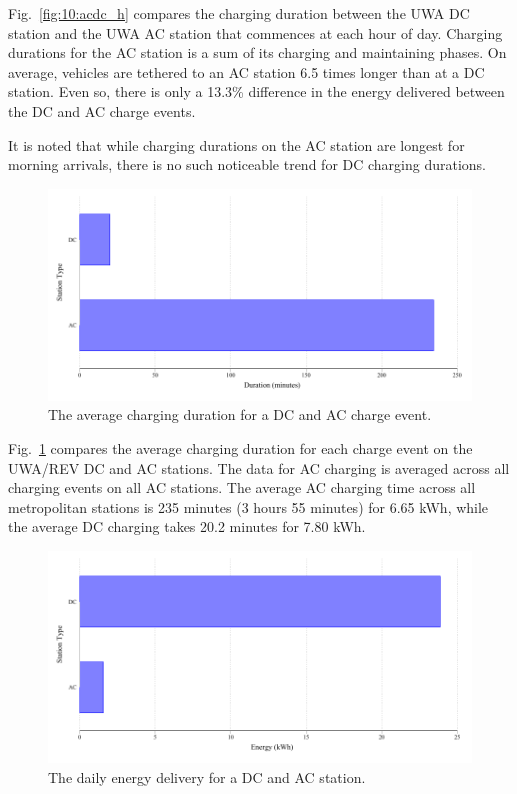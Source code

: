 Fig.~\ref{fig:10:acdc_h} compares the charging duration between the UWA DC station and the UWA AC station that commences at each hour of day. Charging durations for the AC station is a sum of its charging and maintaining phases. On average, vehicles are tethered to an AC station 6.5 times longer than at a DC station. Even so, there is only a 13.3\% difference in the energy delivered between the DC and AC charge events. 

It is noted that while charging durations on the AC station are longest for morning arrivals, there is no such noticeable trend for DC charging durations. 

\begin{figure}[H]
	\centering
	\includegraphics[width=0.8\linewidth]{acdc_t_h}
	\caption{The average charging duration for a DC and AC charge event.}
	\label{fig:10:acdc_t_h}
\end{figure}

Fig.~\ref{fig:10:acdc_t_h} compares the average charging duration for each charge event on the UWA/REV DC and AC stations. The data for AC charging is averaged across all charging events on all AC stations. The average AC charging time across all metropolitan stations is 235 minutes (3 hours 55 minutes) for 6.65 kWh, while the average DC charging takes 20.2 minutes for 7.80 kWh.

\begin{figure}[H]
	\centering
	\includegraphics[width=0.8\linewidth]{acdc_t_e}
	\caption{The daily energy delivery for a DC and AC station.}
	\label{fig:10:acdc_t_e}
\end{figure}

